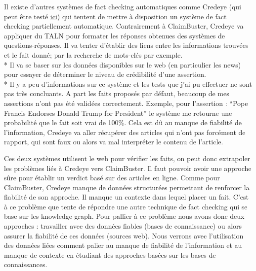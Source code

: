 Il existe d'autres systèmes de fact checking automatiques comme Credeye \cite{popat2018credeye} (qui peut être testé \href{https://gate.d5.mpi-inf.mpg.de/credeye/}{ici}) qui tentent de mettre à disposition un système de fact checking partiellement automatique. Contrairement à ClaimBuster, Credeye va appliquer du TALN pour formater les réponses obtenues des systèmes de questions-réponses. Il va tenter d'établir des liens entre les informations trouvées et le fait donné; par la recherche de mots-clés par exemple.
\\*
Il va se baser sur les données disponibles sur le web (en particulier les news) pour essayer de déterminer le niveau de crédibilité d'une assertion. 
\\*
Il y a peu d'informations sur ce système et les tests que j'ai pu effectuer ne sont pas très concluants. A part les faits proposés par défaut, beaucoup de mes assertions n'ont pas été validées correctement. Exemple, pour l'assertion : \enquote{Pope Francis Endorses Donald Trump for President} le système me retourne une probabilité que le fait soit vrai de 100\%. Cela est dû au manque de fiabilité de l'information, Credeye va aller récupérer des articles qui n'ont pas forcément de rapport, qui sont faux ou alors va mal interpréter le contenu de l'article.

Ces deux systèmes utilisent le web pour vérifier les faits, on peut donc extrapoler les problèmes liés à Credeye vers ClaimBuster. Il faut pouvoir avoir une approche sûre pour établir un verdict basé sur des articles en ligne. Comme pour ClaimBuster, Credeye manque de données structurées permettant de renforcer la fiabilité de son approche. Il manque un contexte dans lequel placer un fait. C'est à ce problème que tente de répondre une autre technique de fact checking qui se base sur les knowledge graph. Pour pallier à ce problème nous avons donc deux approches : travailler avec des données fiables (bases de connaissance) ou alors assurer la fiabilité de ces données (sources web). Nous verrons avec l'utilisation des données liées comment palier au manque de fiabilité de l'information et au manque de contexte en étudiant des approches basées sur les bases de connaissances.